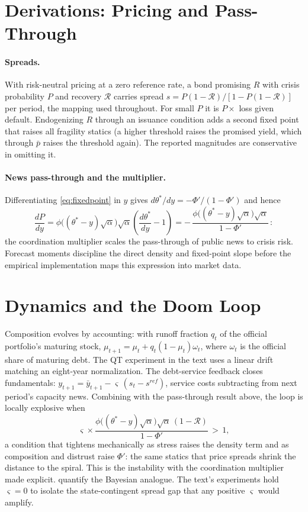 \documentclass[11pt]{article}
\theoremstyle{definition}
\begin{document}
\section{Derivations: Pricing and Pass-Through}\label{app:pricing}

\paragraph{Spreads.} With risk-neutral pricing at a zero reference rate, a bond promising $R$ with crisis probability $P$ and recovery $\mathcal{R}$ carries spread $s = P(1-\mathcal{R})/[1 - P(1-\mathcal{R})]$ per period, the mapping used throughout. For small $P$ it is $P \times$ loss given default. Endogenizing $R$ through an issuance condition adds a second fixed point that raises all fragility statics (a higher threshold raises the promised yield, which through $\bar p$ raises the threshold again). The reported magnitudes are conservative in omitting it.

\paragraph{News pass-through and the multiplier.} Differentiating \eqref{eq:fixedpoint} in $y$ gives $d\theta^*/dy = -\Phi'/(1-\Phi')$ and hence
\[
\frac{dP}{dy} = \phi\big((\theta^*-y)\sqrt\alpha\big)\sqrt\alpha \left(\frac{d\theta^*}{dy} - 1\right) = -\,\frac{\phi\big((\theta^*-y)\sqrt\alpha\big)\sqrt\alpha}{1 - \Phi'}\,:
\]
the coordination multiplier scales the pass-through of public news to crisis risk. Forecast moments discipline the direct density and fixed-point slope before the empirical implementation maps this expression into market data.

\section{Dynamics and the Doom Loop}\label{app:dynamics}

Composition evolves by accounting: with runoff fraction $q_t$ of the official portfolio's maturing stock, $\mu_{t+1} = \mu_t + q_t(1 - \mu_t)\omega_t$, where $\omega_t$ is the official share of maturing debt. The QT experiment in the text uses a linear drift matching an eight-year normalization. The debt-service feedback closes fundamentals: $y_{t+1} = \bar y_{t+1} - \varsigma\,(s_t - s^{ref})$, service costs subtracting from next period's capacity news. Combining with the pass-through result above, the loop is locally explosive when
\[
\varsigma \times \frac{\phi\big((\theta^*-y)\sqrt\alpha\big)\sqrt\alpha\,(1-\mathcal{R})}{1 - \Phi'} \,>\, 1,
\]
a condition that tightens mechanically as stress raises the density term and as composition and distrust raise $\Phi'$: the same statics that price spreads shrink the distance to the spiral. This is the \citet{Calvo1988} instability with the coordination multiplier made explicit. \citet{BocolaDovis2019} quantify the Bayesian analogue. The text's experiments hold $\varsigma = 0$ to isolate the state-contingent spread gap that any positive $\varsigma$ would amplify.
\end{document}
